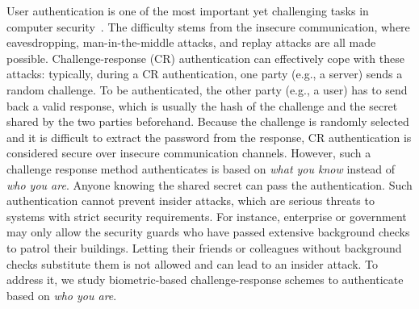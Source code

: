 \label{sec:intro}






User authentication is one of the most important yet challenging tasks in computer security~\cite{Uell:CCS13,Monrose:CCS99,Zheng:CCS11,Ahmed:TPDS07,Ari:CCS13}. The difficulty stems from the insecure communication, where eavesdropping, man-in-the-middle attacks, and replay attacks are all made possible. Challenge-response (CR) authentication can effectively cope with these attacks: typically, during a CR authentication, one party (e.g., a server) sends a random challenge. To be authenticated, the other party (e.g., a user) has to send back a valid response, which is usually the hash of the challenge and the secret shared by the two parties beforehand. Because the challenge is randomly selected and it is difficult to extract the password from the response,  CR authentication is considered secure over insecure communication channels.  However, such a challenge response method authenticates is based on \textit{what you know} instead of \textit{who you are}. Anyone knowing the shared secret can pass the authentication. Such authentication cannot prevent insider attacks, which are serious threats to systems with strict security requirements. For instance, enterprise or government may only allow the security guards who have passed extensive background checks to patrol their buildings. Letting their friends or colleagues without background checks substitute them is not allowed and can lead to an insider attack. To address it, we study biometric-based challenge-response schemes to authenticate based on \textit{who you are}. 


